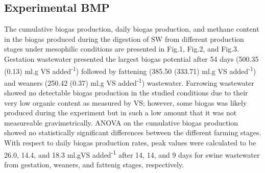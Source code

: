 \subsection{Experimental BMP}
The cumulative biogas production, daily biogas production, and methane content in the biogas produced during the digestion of SW from different production stages under mesophilic conditions are presented in Fig.1, Fig.2, and Fig.3. Gestation wastewater presented the largest biogas potential after 54 days (500.35 (0.13) ml.g VS added\textsuperscript{-1}) followed by fattening (385.50 (333.71) ml.g VS added\textsuperscript{-1}) and weaners (250.42 (0.37) ml.g VS added\textsuperscript{-1}) wastewater. Farrowing wastewater showed no detectable biogas production in the studied conditions due to their very low organic content as measured by VS; however, some biogas was likely produced during the experiment but in such a low amount that it was not measureable gravimetrically.  ANOVA on the cumulative biogas production showed no statistically significant differences between the different farming stages. With respect to daily biogas production rates, peak values were calculated to be 26.0, 14.4, and 18.3 ml.gVS added\textsuperscript{-1} after 14, 14, and 9 days for swine wastewater from gestation, weaners, and fattenig stages, respectively.